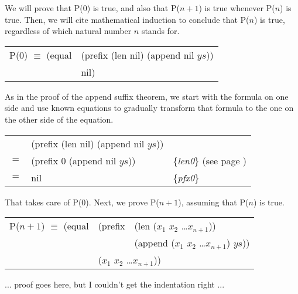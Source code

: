 We will prove that P(0) is true, and also that P($n+1$) is true whenever P($n$) is true. Then, we will cite mathematical induction to conclude that P($n$) is true, regardless of which natural number $n$ stands for.

\begin{center}
\begin{tabular}{ll}
P(0) $\equiv$ (equal & (prefix (len nil) (append nil $ys$)) \\
                     & nil)                                 \\
\end{tabular}
\end{center}

As in the proof of the append suffix theorem, we start with the formula on one side and use known equations to gradually transform that formula to the one on the other side of the equation.

\begin{center}
\begin{tabular}{lll}
    & (prefix (len nil) (append nil $ys$))  &                                                      \\
$=$ & (prefix 0 (append nil $ys$))          & \{\emph{len0}\} (see page \pageref{len-equations})   \\
$=$ & nil                                   & \{\emph{pfx0}\}                                      \\
\end{tabular}
\end{center}

That takes care of P(0). Next, we prove P($n+1$), assuming that P($n$) is true.

\begin{center}
\begin{tabular}{lll}
P($n+1$) $\equiv$ (equal & (prefix & (len ($x_1$ $x_2$ \dots $x_{n+1}$))          \\
                         &         & (append ($x_1$ $x_2$ \dots $x_{n+1}$) $ys$)) \\
                         & \multicolumn{2}{l}{($x_1$ $x_2$ \dots $x_{n+1}$))}     \\
\end{tabular}
\end{center}

... proof goes here, but I couldn't get the indentation right ...

\begin{comment}
\todo{Rex: This isn't perfect, but it's close.  I haven't figured out how to remove the vertical space before the tabbing, though I can probably hack it....}
\end{comment}

